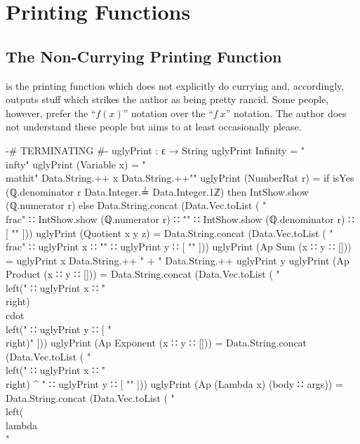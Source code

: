 \documentclass{report}
\begin{document}
\chapter{Printing Functions}

\section{The Non-Currying Printing Function}
 is the printing function which does not explicitly do currying and, accordingly, outputs stuff which strikes the author as being pretty rancid.  Some people, however, prefer the ``\(f\left(x\right)\)'' notation over the ``\(f\ x\)'' notation.  The author does not understand these people but aims to at least occasionally please.

\begin{code}
  {-# TERMINATING #-}
  uglyPrint : ε → String
  uglyPrint Infinity = "\\infty"
  uglyPrint (Variable x) = "\\mathit{" Data.String.++ x Data.String.++"}"
  uglyPrint (NumberRat r) =
    if isYes (ℚ.denominator r Data.Integer.≟ Data.Integer.1ℤ)
       then IntShow.show (ℚ.numerator r)
       else Data.String.concat (Data.Vec.toList
              ( "\\frac{"
              ∷ IntShow.show (ℚ.numerator r)
              ∷ "}{"
              ∷ IntShow.show (ℚ.denominator r)
              ∷ [ "}" ]))
  uglyPrint (Quotient x y z) =
    Data.String.concat (Data.Vec.toList
      ( "\\frac{"
      ∷ uglyPrint x
      ∷ "}{"
      ∷ uglyPrint y
      ∷ [ "}" ]))
  uglyPrint (Ap Sum (x ∷ y ∷ [])) =
    uglyPrint x Data.String.++ " + " Data.String.++ uglyPrint y
  uglyPrint (Ap Product (x ∷ y ∷ [])) =
    Data.String.concat (Data.Vec.toList
      ( "\\left("
      ∷ uglyPrint x
      ∷ "\\right) \\cdot \\left("
      ∷ uglyPrint y
      ∷ [ "\\right)" ]))
  uglyPrint (Ap Exponent (x ∷ y ∷ [])) =
    Data.String.concat (Data.Vec.toList
      ( "\\left("
      ∷ uglyPrint x
      ∷ "\\right) ^ {"
      ∷ uglyPrint y
      ∷ [ "}" ]))
  uglyPrint (Ap (Lambda x) (body ∷ args)) =
    Data.String.concat (Data.Vec.toList
      ( "\\left(\\lambda\\ "

\end{code}
\end{document}
